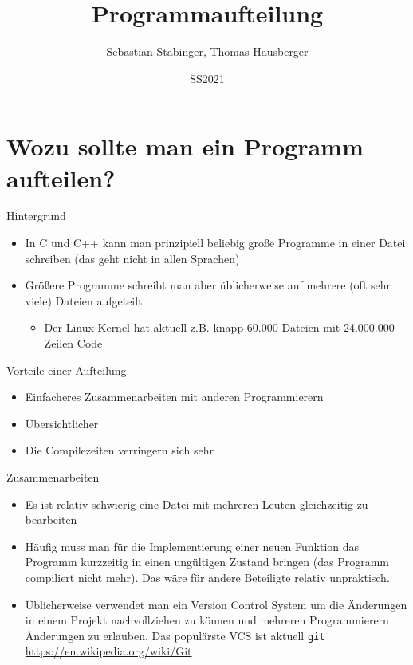 \documentclass[presentation]{beamer}
\author{Sebastian Stabinger, Thomas Hausberger}
\date{SS2021}
\title{Programmaufteilung}
\begin{document}
\maketitle

\section{Wozu sollte man ein Programm aufteilen?}
\label{sec:orgcd7bc51}
\begin{frame}[label={sec:orgd8802d1}]{Hintergrund}
\begin{itemize}
\item In C und C++ kann man prinzipiell beliebig große Programme in einer
Datei schreiben (das geht nicht in allen Sprachen)
\item Größere Programme schreibt man aber üblicherweise auf mehrere (oft
sehr viele) Dateien aufgeteilt
\begin{itemize}
\item Der Linux Kernel hat aktuell z.B. knapp 60.000 Dateien mit
24.000.000 Zeilen Code
\end{itemize}
\end{itemize}
\begin{block}{Vorteile einer Aufteilung}
\begin{itemize}
\item Einfacheres Zusammenarbeiten mit anderen Programmierern
\item Übersichtlicher
\item Die Compilezeiten verringern sich sehr
\end{itemize}
\end{block}
\end{frame}
\begin{frame}[label={sec:orgc25f9f5},fragile]{Zusammenarbeiten}
 \begin{itemize}
\item Es ist relativ schwierig eine Datei mit mehreren Leuten gleichzeitig
zu bearbeiten
\item Häufig muss man für die Implementierung einer neuen Funktion das
Programm \alert{kurzzeitig in einen ungültigen Zustand bringen} (das
Programm compiliert nicht mehr). Das wäre für andere Beteiligte
relativ unpraktisch.
\item Üblicherweise verwendet man ein \alert{Version Control System} um die
Änderungen in einem Projekt nachvollziehen zu können und mehreren
Programmierern Änderungen zu erlauben. Das populärste VCS ist
aktuell {\color{solarizedYellow}\texttt{git} }\url{https://en.wikipedia.org/wiki/Git}
\end{itemize}
\end{frame}
\end{document}
